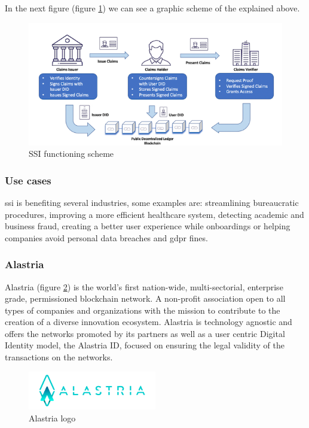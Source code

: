 \documentclass[a4paper, 12pt]{article} %
\begin{document}
                    In the next figure (figure \ref{fig:ssi-scheme}) we can see a graphic scheme of the explained above.
                    \begin{figure}[h]
                        \centering
                        \includegraphics[width=1.0\textwidth]{how-to-ssi.png}
                        \caption{SSI functioning scheme}
                        \label{fig:ssi-scheme}
                    \end{figure}

            \subsubsection{Use cases}
                \acrlong{ssi} is benefiting several industries\cite{ssi-guide}, some examples are: streamlining bureaucratic procedures, improving a more efficient healthcare system, detecting academic and business fraud, creating a better user experience while onboardings or helping companies avoid personal data breaches and \acrshort{gdpr}\cite{gdpr} fines.

            \subsubsection{Alastria}
                Alastria (figure \ref{fig:alastria_logo}) is the world's first nation-wide, multi-sectorial, enterprise grade, permissioned blockchain network. A non-profit association open to all types of companies and organizations with the mission to contribute to the creation of a diverse innovation ecosystem. Alastria is technology agnostic and offers the networks promoted by its partners as well as a user centric Digital Identity model, the Alastria ID, focused on ensuring the legal validity of the transactions on the networks.
                \begin{figure}[h]
                    \centering
                    \includegraphics[width=0.5\textwidth]{alastria-logo.png}
                    \caption{Alastria logo}
                    \label{fig:alastria_logo}
                \end{figure}
\end{document}
